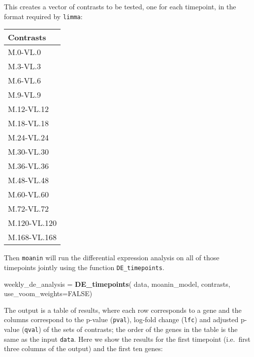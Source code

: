 \documentclass[9pt,a4paper,]{extarticle}
\newenvironment{Shaded}{\begin{snugshade}}{\end{snugshade}}
\newcommand{\DataTypeTok}[1]{\textcolor[rgb]{0.13,0.29,0.53}{#1}}
\newcommand{\KeywordTok}[1]{\textcolor[rgb]{0.13,0.29,0.53}{\textbf{#1}}}
\newcommand{\NormalTok}[1]{#1}
\newcommand{\OtherTok}[1]{\textcolor[rgb]{0.56,0.35,0.01}{#1}}
\newcommand{\StringTok}[1]{\textcolor[rgb]{0.31,0.60,0.02}{#1}}
\begin{document}
This creates a vector of contrasts to be tested, one for each timepoint, in the format required by \texttt{limma}:

\begin{tabular}{l}
\toprule
Contrasts\\
\midrule
M.0-VL.0\\
M.3-VL.3\\
M.6-VL.6\\
M.9-VL.9\\
M.12-VL.12\\
\addlinespace
M.18-VL.18\\
M.24-VL.24\\
M.30-VL.30\\
M.36-VL.36\\
M.48-VL.48\\
\addlinespace
M.60-VL.60\\
M.72-VL.72\\
M.120-VL.120\\
M.168-VL.168\\
\bottomrule
\end{tabular}

Then \texttt{moanin} will run the differential expression analysis on all of those timepoints
jointly using the function \texttt{DE\_timepoints}.

\begin{Shaded}
\begin{Highlighting}[]
\NormalTok{weekly_de_analysis =}\StringTok{ }\KeywordTok{DE_timepoints}\NormalTok{(}
\NormalTok{     data, moanin_model, contrasts,}
     \DataTypeTok{use_voom_weights=}\OtherTok{FALSE}\NormalTok{)}
\end{Highlighting}
\end{Shaded}

The output is a table of results, where each row corresponds to a gene and the
columns correspond to the p-value (\texttt{pval}), log-fold change (\texttt{lfc}) and
adjusted p-value (\texttt{qval}) of the sets of contrasts; the order of the genes in
the table is the same as the input \texttt{data}. Here we show the results for the
first timepoint (i.e.~first three columns of the output) and the first ten
genes:
\end{document}

